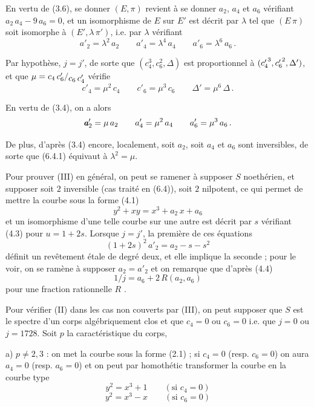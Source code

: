En vertu de (3.6), se donner $(E,\pi)$ revient à se donner $a_2$, $a_4$ et $a_6$ vérifiant $a_2\,a_4-9\,a_6=0$, et un isomorphisme de $E$ sur $E'$ est décrit par $\lambda$ tel que $(E\,\pi)$ soit isomorphe à $(E',\lambda\,\pi')$, i.e. par $\lambda$ vérifiant
\[
a'_2=\lambda^2\,a_2 \qquad a'_4=\lambda^4\,a_4 \qquad a'_6=\lambda^6\,a_6 \, . \tag*{(6.4.1)}
\]

Par hypothèse, $j=j'$, de sorte que $(c_4^3,c_6^2,\Delta)$ est proportionnel à $(c_4^{\raisebox{-.38ex}{$\scriptstyle\prime$}\,3},c_6^{\raisebox{-.38ex}{$\scriptstyle\prime$}\,2},\Delta')$, et que $\mu=c_4\,c'_6/\raisebox{-.52ex}{$c_6\,c'_4$}$ vérifie
\[
c'_4=\mu^2\,c_4 \qquad c'_6=\mu^3\,c_6 \qquad \Delta'=\mu^6\,\Delta \, . \tag*{(6.4.2)}
\]

En vertu de (3.4), on a alors
\[
{\mathbb{\text{\makebox[0pt][l]{\kern.45pt$a$}$a$}}}'_2=\mu\,a_2 \qquad a'_4=\mu^2\,a_4 \qquad a'_6=\mu^3\,a_6 \, .
\]

De plus, d'après (3.4) encore, localement, soit $a_2$, soit $a_4$ et $a_6$ sont inversibles, de sorte que (6.4.1) équivaut à $\lambda^2=\mu$.

Pour prouver (III) en général, on peut se ramener à supposer $S$ noethérien, et supposer soit $2$ inversible (cas traité en (6.4)), soit%
%
\space
$2$ nilpotent, ce qui permet de mettre la courbe sous la forme (4.1)
\[
y^2+xy=x^3+a_2\,x+a_6
\]
et un isomorphisme d'une telle courbe sur une autre est décrit par $s$ vérifiant (4.3) pour $u=1+2s$. Lorsque $j=j'$, la première de ces équations
\[
(1+2s)^2\,a'_2=a_2-s-s^2
\]
définit un revêtement étale de degré deux, et elle implique la seconde ; pour le voir, on se ramène à supposer $a_2=a'_2$ et on remarque que d'après (4.4)
\[
1/j=a_6+2\,R(a_2,a_6)
\]
pour une fraction rationnelle $R$ .

Pour vérifier (II) dans les cas non couverts par (III), on peut supposer que $S$ est le spectre d'un corps algébriquement clos et que $c_4=0$ ou $c_6=0$  i.e. que $j=0$ ou $j=1728$. Soit $p$ la caractéristique du corps,

a) $p\ne 2,3$ : on met la courbe sous la forme (2.1) ; si $c_4=0$ (resp. $c_6=0$) on aura $a_4=0$ (resp. $a_6=0$) et on peut par homothétic transformer la courbe en la courbe type
\[
y^2=x^3+1 \qquad (\text{si }c_4=0) \tag*{(6.5)}
\]
\[
y^2=x^3-x \qquad (\text{si }c_6=0) \tag*{(6.6)}
\]


